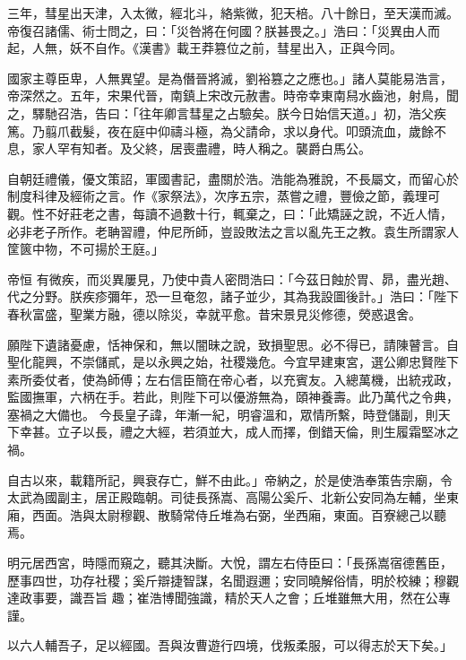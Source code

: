 \begin{pinyinscope}
 三年，彗星出天津，入太微，經北斗，絡紫微，犯天棓。八十餘日，至天漢而滅。帝復召諸儒、術士問之，曰：「災咎將在何國？朕甚畏之。」浩曰：「災異由人而起，人無，妖不自作。《漢書》載王莽篡位之前，彗星出入，正與今同。



 國家主尊臣卑，人無異望。是為僭晉將滅，劉裕篡之之應也。」諸人莫能易浩言，帝深然之。五年，宋果代晉，南鎮上宋改元赦書。時帝幸東南舄水齒池，射鳥，聞
 之，驛馳召浩，告曰：「往年卿言彗星之占驗矣。朕今日始信天道。」初，浩父疾篤。乃翦爪截髮，夜在庭中仰禱斗極，為父請命，求以身代。叩頭流血，歲餘不息，家人罕有知者。及父終，居喪盡禮，時人稱之。襲爵白馬公。



 自朝廷禮儀，優文策詔，軍國書記，盡關於浩。浩能為雅說，不長屬文，而留心於制度科律及經術之言。作《家祭法》，次序五宗，蒸嘗之禮，豐儉之節，義理可觀。性不好莊老之書，每讀不過數十行，輒棄之，曰：「此矯誣之說，不近人情，必非老子所作。老聃習禮，仲尼所師，豈設敗法之言以亂先王之教。袁生所謂家人筐篋中物，不可揚於王庭。」



 帝恒
 有微疾，而災異屢見，乃使中貴人密問浩曰：「今茲日蝕於胃、昴，盡光趙、代之分野。朕疾疹彌年，恐一旦奄忽，諸子並少，其為我設圖後計。」浩曰：「陛下春秋富盛，聖業方融，德以除災，幸就平愈。昔宋景見災修德，熒惑退舍。



 願陛下遺諸憂慮，恬神保和，無以闇昧之說，致損聖思。必不得已，請陳瞽言。自聖化龍興，不崇儲貳，是以永興之始，社稷幾危。今宜早建東宮，選公卿忠賢陛下素所委仗者，使為師傅；左右信臣簡在帝心者，以充賓友。入總萬機，出統戎政，監國撫軍，六柄在手。若此，則陛下可以優游無為，頤神養壽。此乃萬代之令典，塞禍之大備也。
 今長皇子諱，年漸一紀，明睿溫和，眾情所繫，時登儲副，則天下幸甚。立子以長，禮之大經，若須並大，成人而擇，倒錯天倫，則生履霜堅冰之禍。



 自古以來，載籍所記，興衰存亡，鮮不由此。」帝納之，於是使浩奉策告宗廟，令太武為國副主，居正殿臨朝。司徒長孫嵩、高陽公奚斤、北新公安同為左輔，坐東廂，西面。浩與太尉穆觀、散騎常侍丘堆為右弼，坐西廂，東面。百寮總己以聽焉。



 明元居西宮，時隱而窺之，聽其決斷。大悅，謂左右侍臣曰：「長孫嵩宿德舊臣，歷事四世，功存社稷；奚斤辯捷智謀，名聞遐邇；安同曉解俗情，明於校練；穆觀達政事要，識吾旨
 趣；崔浩博聞強識，精於天人之會；丘堆雖無大用，然在公專謹。



 以六人輔吾子，足以經國。吾與汝曹遊行四境，伐叛柔服，可以得志於天下矣。」




\end{pinyinscope}
